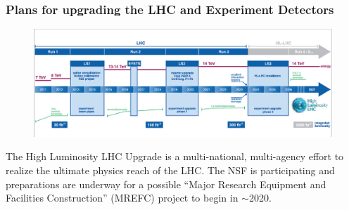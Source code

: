 \begin{frame}
\frametitle{Plans for upgrading the LHC and Experiment Detectors}

\begin{figure}[htbp]
\begin{center}
\includegraphics[width=1.0\textwidth]{images/lhc-upgrade-timeline-detail.png}
\end{center}
\end{figure}

\small{The High Luminosity LHC Upgrade is a multi-national, multi-agency 
effort to realize the ultimate physics reach of the LHC. The NSF is
participating and preparations are underway
for a possible ``Major Research Equipment and Facilities Construction'' (MREFC) project to begin in $\sim$2020.}

\end{frame}


